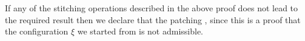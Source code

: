 \documentclass[12pt]{memoir}
\newcommand{\fld}[1]{\ensuremath{\textit{#1}}}
\newcommand{\R}{R}
\newcommand{\Addr}{\fld{Addr}}
\newcommand{\cAddr}{\fld{cAddr}}
\newcommand{\cDrift}{\fld{cDrift}}
\newcommand{\front}{\mathrm{front}}
\begin{document}
\begin{definition}\label{def:patching-failure}
If any of the stitching operations described in the above proof
does not lead to the required result then we
declare that the patching , since this is 
a proof that the configuration \( \xi \) we started from is not admissible.
\end{definition}




\end{document}
